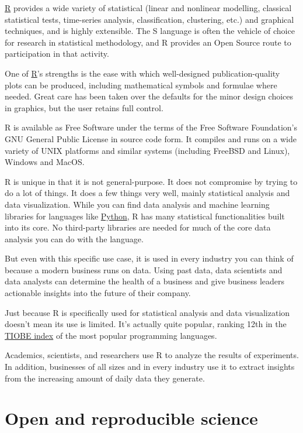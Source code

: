 \documentclass[
  12pt,
]{book}
\begin{document}
\href{https://r-project.org}{R} provides a wide variety of statistical (linear and nonlinear modelling, classical statistical tests, time-series analysis, classification, clustering, etc.) and graphical techniques, and is highly extensible. The S language is often the vehicle of choice for research in statistical methodology, and R provides an Open Source route to participation in that activity.

One of \href{https://r-project.org}{R}'s strengths is the ease with which well-designed publication-quality plots can be produced, including mathematical symbols and formulae where needed. Great care has been taken over the defaults for the minor design choices in graphics, but the user retains full control.

R is available as Free Software under the terms of the Free Software Foundation's GNU General Public License in source code form. It compiles and runs on a wide variety of UNIX platforms and similar systems (including FreeBSD and Linux), Windows and MacOS.

R is unique in that it is not general-purpose. It does not compromise by trying to do a lot of things. It does a few things very well, mainly statistical analysis and data visualization. While you can find data analysis and machine learning libraries for languages like \href{https://www.python.org/}{Python}, R has many statistical functionalities built into its core. No third-party libraries are needed for much of the core data analysis you can do with the language.

But even with this specific use case, it is used in every industry you can think of because a modern business runs on data. Using past data, data scientists and data analysts can determine the health of a business and give business leaders actionable insights into the future of their company.

Just because R is specifically used for statistical analysis and data visualization doesn't mean its use is limited. It's actually quite popular, ranking 12th in the \href{https://www.tiobe.com/tiobe-index/}{TIOBE index} of the most popular programming languages.

Academics, scientists, and researchers use R to analyze the results of experiments. In addition, businesses of all sizes and in every industry use it to extract insights from the increasing amount of daily data they generate.

\hypertarget{open-and-reproducible-science}{%
\section{Open and reproducible science}\label{open-and-reproducible-science}}
\end{document}
